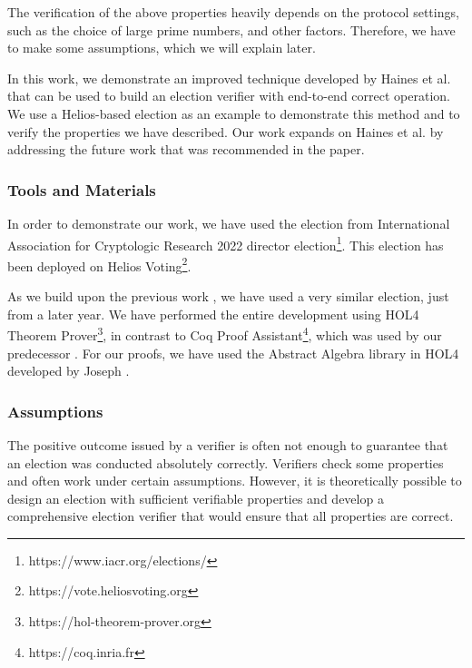     The verification of the above properties heavily depends on the protocol settings, such as the choice of large prime numbers, and other factors. Therefore, we have to make some assumptions, which we will explain later.

    In this work, we demonstrate an improved technique developed by Haines et al. \cite{Haines2019VerifiedVF} that can be used to build an election verifier with end-to-end correct operation. We use a Helios-based election as an example to demonstrate this method and to verify the properties we have described. Our work expands on Haines et al. \cite{Haines2019VerifiedVF} by addressing the future work that was recommended in the paper.


    \subsubsection{Tools and Materials}
    In order to demonstrate our work, we have used the election from International Association for Cryptologic Research 2022 director election\footnote{https://www.iacr.org/elections/}. This election has been deployed on Helios Voting\footnote{https://vote.heliosvoting.org}.

    As we build upon the previous work \cite{Haines2019VerifiedVF}, we have used a very similar election, just from a later year. We have performed the entire development using HOL4 Theorem Prover\footnote{https://hol-theorem-prover.org}, in contrast to Coq Proof Assistant\footnote{https://coq.inria.fr}, which was used by our predecessor \cite{Haines2019VerifiedVF}. For our proofs, we have used the Abstract Algebra library in HOL4 developed by Joseph \cite{Chan2018ClassificationOF}.


    \subsubsection{Assumptions}
    The positive outcome issued by a verifier is often not enough to guarantee that an election was conducted absolutely correctly. Verifiers check some properties and often work under certain assumptions. However, it is theoretically possible to design an election with sufficient verifiable properties and develop a comprehensive election verifier that would ensure that all properties are correct.

